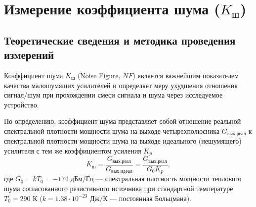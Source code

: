 \section{Измерение коэффициента шума ($K_{\text{ш}}$)}

\subsection{Теоретические сведения и методика проведения измерений}

Коэффициент шума $K_{\text{ш}}$ (Noise Figure, $NF$) является важнейшим показателем качества малошумящих усилителей и определяет меру ухудшения отношения сигнал/шум при прохождении смеси сигнала и шума через исследуемое устройство. 

По определению, коэффициент шума представляет собой отношение реальной спектральной плотности мощности шума на выходе четырехполюсника $G_{\text{вых.реал}}$ к спектральной плотности мощности шума на выходе идеального (нешумящего) усилителя с тем же коэффициентом усиления $K_p$
\begin{equation}
K_{\text{ш}} = \frac{G_{\text{вых.реал}}}{G_{\text{вых.идеал}}} = \frac{G_{\text{вых.реал}}}{G_0 K_p},
\end{equation}
где $G_0 = k T_0 = -174\text{ дБм/Гц}$ --- спектральная плотность мощности теплового шума согласованного резистивного источника при стандартной температуре $T_0 = 290\text{ К}$ ($k = 1.38 \cdot 10^{-23}\text{ Дж/К}$ --- постоянная Больцмана).


